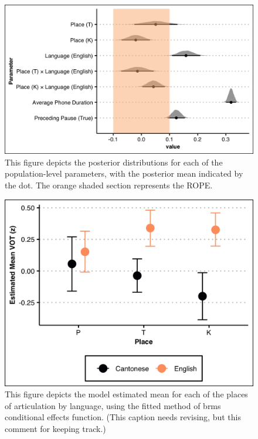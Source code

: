 \begin{figure}[htbp]
  \begin{center}
  \includegraphics[width=\linewidth]{figures/ch4_poppar_5in.png} 
  \caption{This figure depicts the posterior distributions for each of the population-level parameters, with the posterior mean indicated by the dot. The orange shaded section represents the ROPE.}
  \label{ch4:fig:poppar}
  \end{center}
\end{figure}

\begin{figure}[htbp]
  \begin{center}
  \includegraphics[width=0.8\linewidth]{figures/ch4_conditionaleffects_4in.png} 
  \caption{This figure depicts the model estimated mean for each of the places of articulation by language, using the fitted method of brms conditional effects function. (This caption needs revising, but this comment for keeping track.)}
  \label{ch4:fig:conditionaleffects}
  \end{center}
\end{figure}


